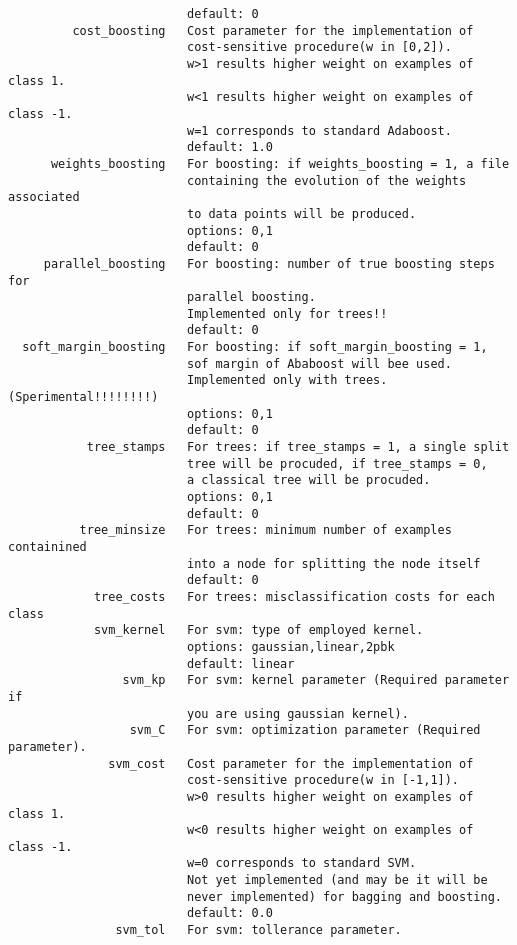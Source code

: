 \begin{verbatim}
                         default: 0
         cost_boosting   Cost parameter for the implementation of
                         cost-sensitive procedure(w in [0,2]).
                         w>1 results higher weight on examples of class 1.
                         w<1 results higher weight on examples of class -1.
                         w=1 corresponds to standard Adaboost.
                         default: 1.0
      weights_boosting   For boosting: if weights_boosting = 1, a file
                         containing the evolution of the weights associated
                         to data points will be produced.
                         options: 0,1
                         default: 0
     parallel_boosting   For boosting: number of true boosting steps for
                         parallel boosting.
                         Implemented only for trees!!
                         default: 0
  soft_margin_boosting   For boosting: if soft_margin_boosting = 1,
                         sof margin of Ababoost will bee used.
                         Implemented only with trees. (Sperimental!!!!!!!!)
                         options: 0,1
                         default: 0
           tree_stamps   For trees: if tree_stamps = 1, a single split
                         tree will be procuded, if tree_stamps = 0,
                         a classical tree will be procuded.
                         options: 0,1
                         default: 0
          tree_minsize   For trees: minimum number of examples containined
                         into a node for splitting the node itself
                         default: 0
            tree_costs   For trees: misclassification costs for each class
            svm_kernel   For svm: type of employed kernel.
                         options: gaussian,linear,2pbk
                         default: linear
                svm_kp   For svm: kernel parameter (Required parameter if
                         you are using gaussian kernel).
                 svm_C   For svm: optimization parameter (Required parameter).
              svm_cost   Cost parameter for the implementation of
                         cost-sensitive procedure(w in [-1,1]).
                         w>0 results higher weight on examples of class 1.
                         w<0 results higher weight on examples of class -1.
                         w=0 corresponds to standard SVM.
                         Not yet implemented (and may be it will be
                         never implemented) for bagging and boosting.
                         default: 0.0
               svm_tol   For svm: tollerance parameter.

\end{verbatim}
